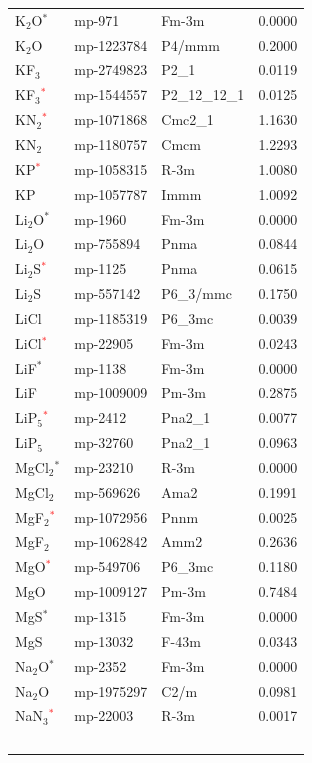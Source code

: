 \begin{longtable}{@{}llll@{}}
\midrule
K$_{2}$O$^*$ & mp-971 & Fm-3m & 0.0000 \\
K$_{2}$O & mp-1223784 & P4/mmm & 0.2000 \\
\midrule
KF$_{3}$ & mp-2749823 & P2\_1 & 0.0119 \\
KF$_{3}$\textcolor{red}{$^*$} & mp-1544557 & P2\_12\_12\_1 & 0.0125 \\
\midrule
KN$_{2}$\textcolor{red}{$^*$} & mp-1071868 & Cmc2\_1 & 1.1630 \\
KN$_{2}$ & mp-1180757 & Cmcm & 1.2293 \\
\midrule
KP\textcolor{red}{$^*$} & mp-1058315 & R-3m & 1.0080 \\
KP & mp-1057787 & Immm & 1.0092 \\
\midrule
Li$_{2}$O$^*$ & mp-1960 & Fm-3m & 0.0000 \\
Li$_{2}$O & mp-755894 & Pnma & 0.0844 \\
\midrule
Li$_{2}$S\textcolor{red}{$^*$} & mp-1125 & Pnma & 0.0615 \\
Li$_{2}$S & mp-557142 & P6\_3/mmc & 0.1750 \\
\midrule
LiCl & mp-1185319 & P6\_3mc & 0.0039 \\
LiCl\textcolor{red}{$^*$} & mp-22905 & Fm-3m & 0.0243 \\
\midrule
LiF$^*$ & mp-1138 & Fm-3m & 0.0000 \\
LiF & mp-1009009 & Pm-3m & 0.2875 \\
\midrule
LiP$_{5}$\textcolor{red}{$^*$} & mp-2412 & Pna2\_1 & 0.0077 \\
LiP$_{5}$ & mp-32760 & Pna2\_1 & 0.0963 \\
\midrule
MgCl$_{2}$$^*$ & mp-23210 & R-3m & 0.0000 \\
MgCl$_{2}$ & mp-569626 & Ama2 & 0.1991 \\
\midrule
MgF$_{2}$\textcolor{red}{$^*$} & mp-1072956 & Pnnm & 0.0025 \\
MgF$_{2}$ & mp-1062842 & Amm2 & 0.2636 \\
\midrule
MgO\textcolor{red}{$^*$} & mp-549706 & P6\_3mc & 0.1180 \\
MgO & mp-1009127 & Pm-3m & 0.7484 \\
\midrule
MgS$^*$ & mp-1315 & Fm-3m & 0.0000 \\
MgS & mp-13032 & F-43m & 0.0343 \\
\midrule
Na$_{2}$O$^*$ & mp-2352 & Fm-3m & 0.0000 \\
Na$_{2}$O & mp-1975297 & C2/m & 0.0981 \\
\midrule
NaN$_{3}$\textcolor{red}{$^*$} & mp-22003 & R-3m & 0.0017 \\
$$
\end{longtable}
